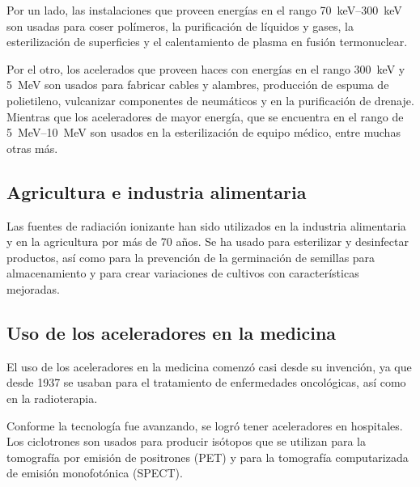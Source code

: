 \documentclass[12pt]{article}
\theoremstyle{break}
\theoremstyle{nonumberbreak}
\begin{document}
    Por un lado, las instalaciones que proveen energías en el rango \qtyrange{70}{300}{\keV} son usadas para coser polímeros, la purificación de líquidos y gases, la esterilización de superficies y el calentamiento de plasma en fusión termonuclear.

    Por el otro, los acelerados que proveen haces con energías en el rango \qty{300}{\keV} y \qty{5}{\MeV} son usados para fabricar cables y alambres, producción de espuma de polietileno, vulcanizar componentes de neumáticos y en la purificación de drenaje. Mientras que los aceleradores de mayor energía, que se encuentra en el rango de \qtyrange{5}{10}{\MeV} son usados en la esterilización de equipo médico, entre muchas otras más.

    \subsection{Agricultura e industria alimentaria}

    Las fuentes de radiación ionizante han sido utilizados en la industria alimentaria y en la agricultura por más de 70 años. Se ha usado para esterilizar y desinfectar productos, así como para la prevención de la germinación de semillas para almacenamiento y para crear variaciones de cultivos con características mejoradas.

    \subsection{Uso de los aceleradores en la medicina}

    El uso de los aceleradores en la medicina comenzó casi desde su invención, ya que desde 1937 se usaban para el tratamiento de enfermedades oncológicas, así como en la radioterapia.

    Conforme la tecnología fue avanzando, se logró tener aceleradores en hospitales. Los ciclotrones son usados para producir isótopos que se utilizan para la tomografía por emisión de positrones (PET) y para la tomografía computarizada de emisión monofotónica (SPECT).

    \pagebreak
    \printbibliography
\end{document}
